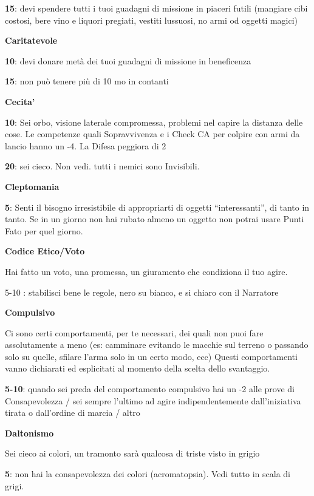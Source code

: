 \documentclass[a4paper,11pt,twoside,openany]{book}
\begin{document}
\textbf{15}: devi spendere tutti i tuoi guadagni di missione in piaceri futili (mangiare cibi costosi, bere vino e liquori pregiati, vestiti lussuosi, no armi od oggetti magici)

\textbf{Caritatevole}

\textbf{10}: devi donare metà dei tuoi guadagni di missione in beneficenza

\textbf{15}: non può tenere più di 10 mo in contanti

\textbf{Cecita'}

\textbf{10}: Sei orbo, visione laterale compromessa, problemi nel capire la distanza delle cose.
Le competenze quali Sopravvivenza e i Check CA per colpire con armi da lancio hanno
un -4. La Difesa peggiora di 2

\textbf{20}: sei cieco. Non vedi. tutti i nemici sono Invisibili.

\textbf{Cleptomania}

\textbf{5}: Senti il bisogno irresistibile di appropriarti di oggetti “interessanti”, di tanto in tanto. Se in un giorno non hai rubato almeno un oggetto non potrai usare Punti Fato per quel giorno.

\textbf{Codice Etico/Voto}

Hai fatto un voto, una promessa, un giuramento che condiziona il tuo agire.

5-10 : stabilisci bene le regole, nero su bianco, e si chiaro con il Narratore

\textbf{Compulsivo}

Ci sono certi comportamenti, per te necessari, dei quali non puoi fare assolutamente a meno (es: camminare evitando le macchie sul terreno o passando solo su quelle, sfilare l'arma solo in un certo modo, ecc)
Questi comportamenti vanno dichiarati ed esplicitati al momento della scelta dello svantaggio.

\textbf{5-10}: quando sei preda del comportamento compulsivo hai un -2 alle prove di Consapevolezza / sei sempre l'ultimo ad agire indipendentemente dall'iniziativa tirata o dall'ordine di marcia / altro

\textbf{Daltonismo}

Sei cieco ai colori, un tramonto sarà qualcosa di triste visto in grigio

\textbf{5}: non hai la consapevolezza dei colori (acromatopsia). Vedi tutto in scala di grigi.
\end{document}

